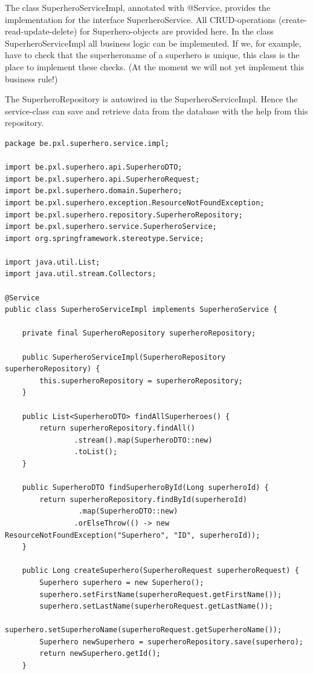 The class SuperheroServiceImpl, annotated with @Service, provides the implementation for the interface SuperheroService.
All CRUD-operations (create-read-update-delete) for Superhero-objects are provided here.
In the class SuperheroServiceImpl all business logic can be implemented.  If we, for example, have to check that the superheroname of a superhero is unique, this class is the place to implement these checks.  (At the moment we will not yet implement this business rule!)

The SuperheroRepository is autowired in the SuperheroServiceImpl. Hence the service-class can save and retrieve data from the database with the help from this repository. 


\begin{lstlisting}[frame=single]
package be.pxl.superhero.service.impl;

import be.pxl.superhero.api.SuperheroDTO;
import be.pxl.superhero.api.SuperheroRequest;
import be.pxl.superhero.domain.Superhero;
import be.pxl.superhero.exception.ResourceNotFoundException;
import be.pxl.superhero.repository.SuperheroRepository;
import be.pxl.superhero.service.SuperheroService;
import org.springframework.stereotype.Service;

import java.util.List;
import java.util.stream.Collectors;

@Service
public class SuperheroServiceImpl implements SuperheroService {

	private final SuperheroRepository superheroRepository;

	public SuperheroServiceImpl(SuperheroRepository superheroRepository) {
		this.superheroRepository = superheroRepository;
	}

	public List<SuperheroDTO> findAllSuperheroes() {
		return superheroRepository.findAll()
				.stream().map(SuperheroDTO::new)
				.toList();
	}

	public SuperheroDTO findSuperheroById(Long superheroId) {
		return superheroRepository.findById(superheroId)
		         .map(SuperheroDTO::new)
				.orElseThrow(() -> new ResourceNotFoundException("Superhero", "ID", superheroId));
	}

	public Long createSuperhero(SuperheroRequest superheroRequest) {
		Superhero superhero = new Superhero();
		superhero.setFirstName(superheroRequest.getFirstName());
		superhero.setLastName(superheroRequest.getLastName());
		superhero.setSuperheroName(superheroRequest.getSuperheroName());
		Superhero newSuperhero = superheroRepository.save(superhero);
		return newSuperhero.getId();
	}


\end{lstlisting}

